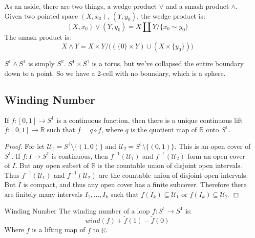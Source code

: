 \documentclass[crop=false,class=book,oneside]{standalone}
\begin{document}
            As an aside, there are two things, a wedge product
            $\lor$ and a smash product $\land$. Given two pointed
            space $(X,x_{0})$, $(Y,y_{0})$, the wedge product is:
            \begin{equation}
                (X,x_{0})\lor(Y,y_{0})
                =X\coprod{Y}/\{x_{0}\sim{y}_{0}\}
            \end{equation}
            The smash product is:
            \begin{equation}
                X\land{Y}=
                X\times{Y}/\Big(
                    (\{0\}\times{Y})\cup(X\times\{y_{0}\})
                \Big)
            \end{equation}
            \begin{example}
                $S^{1}\land{S}^{1}$ is simply $S^{2}$.
                $S^{1}\times{S}^{1}$ is a torus, but we've collapsed
                the entire boundary down to a point. So we have a
                2-cell with no boundary, which is a sphere.
            \end{example}
        \subsection{Winding Number}
            \begin{theorem}
                If $f:[0,1]\rightarrow{S}^{1}$ is a continuous
                function, then there is a unique continuous lift
                $\tilde{f}:[0,1]\rightarrow\mathbb{R}$ such that
                $f=q\circ\tilde{f}$, where $q$ is the quotient map
                of $\mathbb{R}$ onto $S^{1}$.
            \end{theorem}
            \begin{proof}
                For let $\mathcal{U}_{1}=S^{1}\setminus\{(1,0)\}$ and
                $\mathcal{U}_{2}=S^{1}\setminus\{(0,1)\}$. This is an
                open cover of $S^{1}$. If $f:I\rightarrow{S}^{1}$ is
                continuous, then $f^{-1}(\mathcal{U}_{1})$ and
                $f^{-1}(\mathcal{U}_{2})$ form an open cover of
                $I$. But any open subset of $\mathbb{R}$ is the
                countable union of disjoint open intervals. Thus
                $f^{-1}(\mathcal{U}_{1})$ and
                $f^{-1}(\mathcal{U}_{2})$ are the countable union of
                disjoint open intervals. But $I$ is compact, and
                thus any open cover has a finite subcover. Therefore
                there are finitely many intervals $I_{1},\dots,I_{k}$
                such that $f(I_{k})\subseteq\mathcal{U}_{1}$ or
                $f(I_{k})\subseteq\mathcal{U}_{2}$.
            \end{proof}
            \begin{ldefinition}{Winding Number}
                The winding number of a loop
                $f:S^{1}\rightarrow{S}^{1}$ is:
                \begin{equation}
                    wind(f)+\tilde{f}(1)-\tilde{f}(0)
                \end{equation}
                Where $\tilde{f}$ is a lifting map of $f$ to
                $\mathbb{R}$.
            \end{ldefinition}
\end{document}
